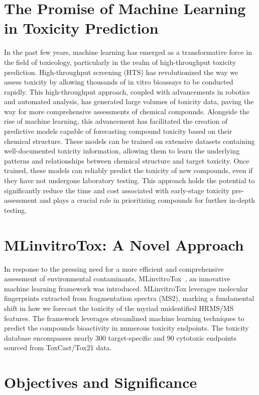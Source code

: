 \section{The Promise of Machine Learning in Toxicity Prediction}

In the past few years, machine learning has emerged as a transformative force in the field of toxicology, particularly in the realm of high-throughput toxicity prediction. High-throughput screening (HTS) has revolutionized the way we assess toxicity by allowing thousands of in vitro bioassays to be conducted rapidly. This high-throughput approach, coupled with advancements in robotics and automated analysis, has generated large volumes of toxicity data, paving the way for more comprehensive assessments of chemical compounds.
Alongside the rise of machine learning, this advancement has facilitated the creation of predictive models capable of forecasting compound toxicity based on their chemical structure. These models can be trained on extensive datasets containing well-documented toxicity information, allowing them to learn the underlying patterns and relationships between chemical structure and target toxicity. Once trained, these models can reliably predict the toxicity of new compounds, even if they have not undergone laboratory testing. This approach holds the potential to significantly reduce the time and cost associated with early-stage toxicity pre-assessment and plays a crucial role in prioritizing compounds for further in-depth testing.

\section{MLinvitroTox: A Novel Approach}

In response to the pressing need for a more efficient and comprehensive assessment of environmental contaminants, MLinvitroTox~\cite{arturi}, an innovative machine learning framework was introduced. MLinvitroTox leverages molecular fingerprints extracted from fragmentation spectra (MS2), marking  a fundamental shift in how we forecast the toxicity of the myriad unidentified HRMS/MS features. The framework leverages streamlined machine learning techniques to predict the compounds bioactivity in numerous toxicity endpoints. The toxicity database encompasses nearly 300 target-specific and 90 cytotoxic endpoints sourced from ToxCast/Tox21 data.

\section{Objectives and Significance}

